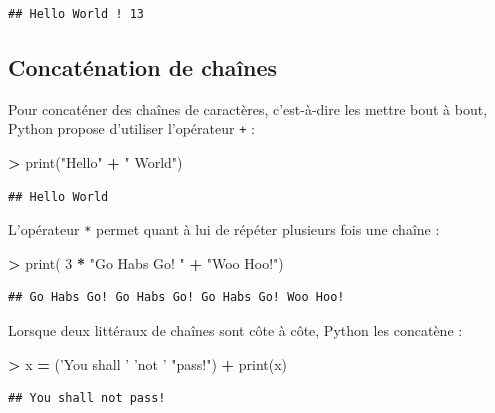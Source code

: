 \documentclass[12pt,]{book}
\newenvironment{Shaded}{\begin{snugshade}}{\end{snugshade}}
\newcommand{\DecValTok}[1]{\textcolor[rgb]{0.00,0.00,0.81}{#1}}
\newcommand{\StringTok}[1]{\textcolor[rgb]{0.31,0.60,0.02}{#1}}
\newcommand{\OperatorTok}[1]{\textcolor[rgb]{0.81,0.36,0.00}{\textbf{#1}}}
\newcommand{\BuiltInTok}[1]{#1}
\newcommand{\NormalTok}[1]{#1}
\numberwithin{equation}{section}
\numberwithin{countremarque}{section}
\begin{document}
\begin{lstlisting}
## Hello World ! 13
\end{lstlisting}

\subsection{Concaténation de chaînes}\label{concatenation-de-chaines}

Pour concaténer des chaînes de caractères, c'est-à-dire les mettre bout
à bout, Python propose d'utiliser l'opérateur \texttt{+} :

\begin{Shaded}
\begin{Highlighting}[]
\OperatorTok{>} \BuiltInTok{print}\NormalTok{(}\StringTok{"Hello"} \OperatorTok{+} \StringTok{" World"}\NormalTok{)}
\end{Highlighting}
\end{Shaded}

\begin{lstlisting}
## Hello World
\end{lstlisting}

L'opérateur \texttt{*} permet quant à lui de répéter plusieurs fois une
chaîne :

\begin{Shaded}
\begin{Highlighting}[]
\OperatorTok{>} \BuiltInTok{print}\NormalTok{( }\DecValTok{3} \OperatorTok{*} \StringTok{"Go Habs Go! "} \OperatorTok{+} \StringTok{"Woo Hoo!"}\NormalTok{)}
\end{Highlighting}
\end{Shaded}

\begin{lstlisting}
## Go Habs Go! Go Habs Go! Go Habs Go! Woo Hoo!
\end{lstlisting}

Lorsque deux littéraux de chaînes sont côte à côte, Python les concatène
:

\begin{Shaded}
\begin{Highlighting}[]
\OperatorTok{>}\NormalTok{ x }\OperatorTok{=}\NormalTok{ (}\StringTok{'You shall '} \StringTok{'not '} \StringTok{"pass!"}\NormalTok{)}
\OperatorTok{+} \BuiltInTok{print}\NormalTok{(x)}
\end{Highlighting}
\end{Shaded}

\begin{lstlisting}
## You shall not pass!
\end{lstlisting}
\end{document}
